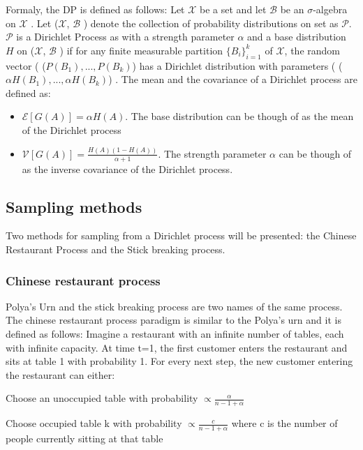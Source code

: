 \documentclass [twoside,hidelinks]{article}
\begin{document}
Formaly, the DP is defined as follows: Let $\mathcal{X}$ be a set and let $\mathcal{B}$ be an $\sigma$-algebra on $\mathcal{X}$ .  Let  ($\mathcal{X} $, $\mathcal{B}$ )  denote the collection of probability distributions on set as $\mathcal{P} $. $\mathcal{P}$ is a Dirichlet Process as with a strength parameter $\alpha$ and a base distribution $H$ on  ($\mathcal{X} $, $\mathcal{B} $ ) if for any finite measurable partition $ \{B_i\}_{i=1}^k$ of $\mathcal{X} $, the random vector  ( ($ P (B_1), ..., P (B_k)$) has a Dirichlet distribution with parameters  ( ($ \alpha H (B_1), ..., \alpha H (B_k)$) . The mean and the covariance of a Dirichlet process are defined as:
\begin{itemize}

	\item{ $ \mathcal{E} [G (A)] = \alpha H (A) $. The base distribution can be though of as the mean of the Dirichlet process}

	\item{$ \mathcal{V} [G (A)] = \frac{H (A) (1-H (A))}{\alpha + 1} $. The strength parameter $\alpha$ can be though of as the inverse covariance of the Dirichlet process. }
\end{itemize}

\subsection{Sampling methods}

Two methods for sampling from a Dirichlet process will be presented: the Chinese Restaurant Process and the Stick breaking process.


\subsubsection{Chinese restaurant process}
\label{sec:crp}
Polya's Urn and the stick breaking process are two names of the same process. The chinese restaurant process paradigm is similar to the Polya's urn and it is defined as follows:
Imagine a restaurant with an infinite number of tables, each with infinite capacity. At time t=1, the first customer enters the restaurant and sits at table 1 with probability 1. For every next step, the new customer entering the restaurant can either: 

\begin{compactitem}
	\item Choose an unoccupied table with probability $ \propto \frac{\alpha}{n-1+ \alpha }$
	\item Choose occupied table k with probability $ \propto  \frac{c}{n-1+ \alpha }$ where c is the number of people currently sitting at that table
\end{compactitem}
\end{document}
